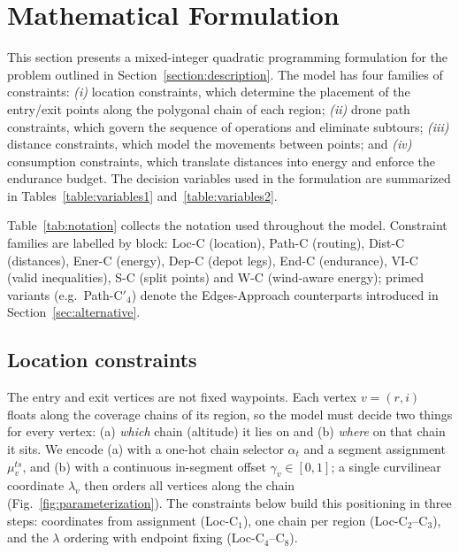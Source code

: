 \documentclass[12pt]{elsarticle}
\begin{document}
\section{Mathematical Formulation}\label{sec:formulation}
This section presents a mixed-integer quadratic programming formulation for the problem outlined in Section~\ref{section:description}. The model has four families of constraints: \emph{(i)} location constraints, which determine the placement of the entry/exit points along the polygonal chain of each region; \emph{(ii)} drone path constraints, which govern the sequence of operations and eliminate subtours; \emph{(iii)} distance constraints, which model the movements between points; and \emph{(iv)} consumption constraints, which translate distances into energy and enforce the endurance budget. The decision variables used in the formulation are summarized in Tables~\ref{table:variables1} and~\ref{table:variables2}.



Table~\ref{tab:notation} collects the notation used throughout the model. Constraint families are labelled by block: Loc-C (location), Path-C (routing), Dist-C (distances), Ener-C (energy), Dep-C (depot legs), End-C (endurance), VI-C (valid inequalities), S-C (split points) and W-C (wind-aware energy); primed variants (e.g.\ Path-C$'_4$) denote the Edges-Approach counterparts introduced in Section~\ref{sec:alternative}.






\subsection{Location constraints}

The entry and exit vertices are not fixed waypoints. Each vertex $v=(r,i)$ floats along the coverage chains of its region, so the model must decide two things for every vertex: (a) \emph{which} chain (altitude) it lies on and (b) \emph{where} on that chain it sits. We encode (a) with a one-hot chain selector $\alpha_t$ and a segment assignment $\mu_v^{ts}$, and (b) with a continuous in-segment offset $\gamma_v\in[0,1]$; a single curvilinear coordinate $\lambda_v$ then orders all vertices along the chain (Fig.~\ref{fig:parameterization}). The constraints below build this positioning in three steps: coordinates from assignment (Loc-C$_1$), one chain per region (Loc-C$_2$--C$_3$), and the $\lambda$ ordering with endpoint fixing (Loc-C$_4$--C$_8$).
\end{document}

